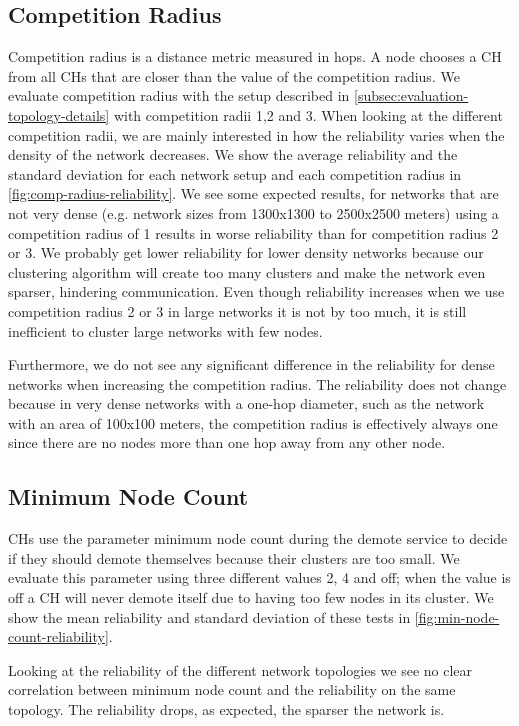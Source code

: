 \subsection{Competition Radius}
Competition radius is a distance metric measured in hops. A node chooses a CH from all CHs that are closer than the value of the competition radius. We evaluate competition radius with the setup described in \cref{subsec:evaluation-topology-details} with competition radii 1,2 and 3. When looking at the different competition radii, we are mainly interested in how the reliability varies when the density of the network decreases. We show the average reliability and the standard deviation for each network setup and each competition radius in \cref{fig:comp-radius-reliability}. We see some expected results, for networks that are not very dense (e.g. network sizes from 1300x1300 to 2500x2500 meters) using a competition radius of 1 results in worse reliability than for competition radius 2 or 3. We probably get lower reliability for lower density networks because our clustering algorithm will create too many clusters and make the network even sparser, hindering communication. Even though reliability increases when we use competition radius 2 or 3 in large networks it is not by too much, it is still inefficient to cluster large networks with few nodes. 

Furthermore, we do not see any significant difference in the reliability for dense networks when increasing the competition radius. The reliability does not change because in very dense networks with a one-hop diameter, such as the network with an area of 100x100 meters, the competition radius is effectively always one since there are no nodes more than one hop away from any other node.

\subsection{Minimum Node Count}
CHs use the parameter minimum node count during the demote service to decide if they should demote themselves because their clusters are too small. We evaluate this parameter using three different values 2, 4 and off; when the value is off a CH will never demote itself due to having too few nodes in its cluster. We show the mean reliability and standard deviation of these tests in \cref{fig:min-node-count-reliability}.

Looking at the reliability of the different network topologies we see no clear correlation between minimum node count and the reliability on the same topology. The reliability drops, as expected, the sparser the network is.

